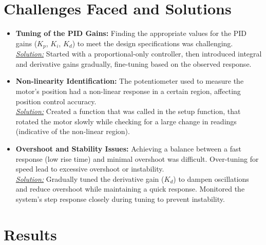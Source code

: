 \documentclass{article}
\begin{document}
\section{Challenges Faced and Solutions}
\begin{itemize}%
    \item \textbf{Tuning of the PID Gains:} Finding the appropriate values for the PID gains ($K_p$, $K_i$, $K_d$) to meet the design specifications was challenging.\\
    \underline{\textit{Solution:}} Started with a proportional-only controller, then introduced integral and derivative gains gradually, fine-tuning based on the observed response.

    \item \textbf{Non-linearity Identification:} The potentiometer used to measure the motor's position had a non-linear response in a certain region, affecting position control accuracy.\\
    \underline{\textit{Solution:}} Created a function that was called in the setup function, that rotated the motor slowly while checking for a large change in readings (indicative of the non-linear region).

    \item \textbf{Overshoot and Stability Issues:} Achieving a balance between a fast response (low rise time) and minimal overshoot was difficult. Over-tuning for speed lead to excessive overshoot or instability.\\
    \underline{\textit{Solution:}} Gradually tuned the derivative gain ($K_d$) to dampen oscillations and reduce overshoot while maintaining a quick response. Monitored the system's step response closely during tuning to prevent instability.
\end{itemize}

\section{Results}
\end{document}

